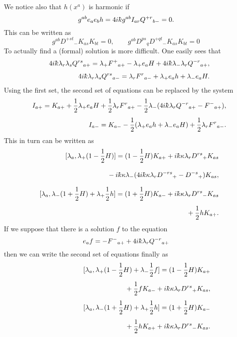 \documentclass[12pt,a4paper]{article}
\newcounter{eg}
\def\kbar{{\mathchar'26\mkern-9muk}}
\begin{document}
We notice also that $h(x^a)$ is harmonic if
\begin{equation}
g^{ab} e_a e_b h = 4i\kbar g^{ab} I_{ar} Q^{+r}{}_{b-} = 0. \label{eq:1}
\end{equation}
This can be written as
$$
g^{ab} D^{+st}{}_- K_{as} K_{bt} = 0,\qquad
g^{ab} D^{ps}{}_q D^{+qt}{}_- K_{as} K_{bt} = 0
$$
To actually find a (formal) solution is more difficult.  One easily
sees that
\begin{eqnarray*}
&&4i\kbar \lambda_r \lambda_s Q^{rs}{}_{a+} = \lambda_+ F^+{}_{a+} -
\lambda_+ e_a H + 4i\kbar \lambda_- \lambda_r Q^{-r}{}_{a+}, \\[4pt]
&&4i\kbar \lambda_r \lambda_s Q^{rs}{}_{a-} = \lambda_r F^r{}_{a-} +
\lambda_+ e_a h + \lambda_- e_a H.
\end{eqnarray*}
Using the first set, the second set of equations can be replaced by
the system
\begin{eqnarray}
&&I_{a+} = K_{a+} + \frac 12 \lambda_+ e_a H
+ \frac 12\lambda_r F^r{}_{a+} - \frac 12 \lambda_- 
(4i\kbar \lambda_r Q^{-r}{}_{a+} - F^-{}_{a+}),     \label{consis7d}\\[4pt]
&&I_{a-} = K_{a-} - \frac 12 (\lambda_+ e_a h 
+ \lambda_- e_a H) + \frac 12\lambda_r F^r{}_{a-}.    \label{consis7e}
\end{eqnarray}
This in turn can be written as
\begin{eqnarray}
&&[\lambda_a, \lambda_+ (1 - \frac 12 H)] = 
(1 - \frac 12 H) K_{a+} +i\kbar\kappa\lambda_r D^{rs}{}_+ K_{as}
\nonumber\\[4pt] 
&&\phantom{[\lambda_a, \lambda_+ (1 - \frac 12 H)]}
- i\kbar\kappa \lambda_- (4i\kbar\kappa \lambda_r 
D^{-rs}{}_{+} - D^{-s}{}_+) K_{as},     \label{consis8d}\\[4pt]
&&[\lambda_a, \lambda_- (1 + \frac 12 H) + \lambda_+ \frac 12 h ] = 
(1 + \frac 12 H) K_{a-} + i\kbar\kappa\lambda_r D^{rs}{}_- K_{as}
\nonumber\\[4pt] 
&&\phantom{[\lambda_a, \lambda_+ (1 + \frac 12 H) + \lambda_+ \frac 12 h ]}
+ \frac 12 h K_{a+}.        \label{consis8e}
\end{eqnarray}
If we suppose that there is a solution $f$ to the equation
$$
e_a f = - F^-{}_{a+} + 4i\kbar\lambda_r Q^{-r}{}_{a+} 
$$
then we can write the second set of equations finally as
\begin{eqnarray}
&&[\lambda_a, \lambda_+ (1 - \frac 12 H) + \lambda_- \frac 12 f ] = 
(1 - \frac 12 H) K_{a+} \nonumber\\[4pt] 
&&\phantom{[\lambda_a, \lambda_+ (1 - \frac 12 H) + \lambda_- \frac 12 f ]}
+ \frac 12 f K_{a-} +i\kbar\kappa\lambda_r D^{rs}{}_+ K_{as},
\label{consis9d}\\[4pt] 
&&[\lambda_a, \lambda_- (1 + \frac 12 H) + \lambda_+ \frac 12 h ] = 
(1 + \frac 12 H) K_{a-} \nonumber\\[4pt] 
&&\phantom{[\lambda_a, \lambda_- (1 + \frac 12 H) + \lambda_+ \frac 12 h ]}
+ \frac 12 h K_{a+} +i\kbar\kappa\lambda_r D^{rs}{}_- K_{as}.
\label{consis9e} 
\end{eqnarray}
\end{document}
